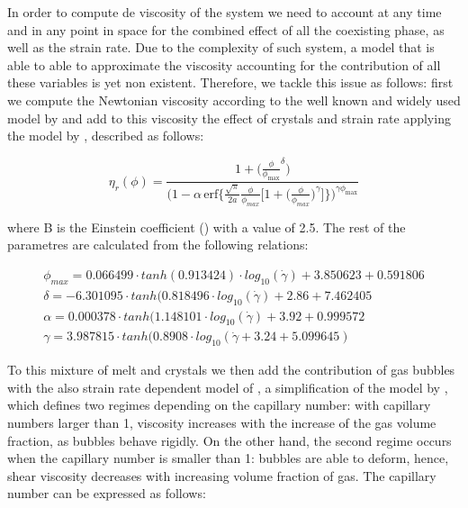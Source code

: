 In order to compute de viscosity of the system we need to account at any time and in any point in space for the combined effect of all the coexisting phase, as well as the strain rate. Due to the complexity of such system, a model that is able to able to approximate the viscosity accounting for the contribution of all these variables is yet non existent. Therefore, we tackle this issue as follows: first we compute the Newtonian viscosity according to the well known and widely used model by \cite{giordano200} and add to this viscosity the effect of crystals and strain rate applying the model by \cite{caricchi2007}, described as follows:

\begin{equation}
\eta_r(\phi) = \frac{1 + \big(\frac{\phi}{\phi_{\text{max}}}^{\delta}\big)}
{\bigg(1 - \alpha \, \text{erf} \bigg\{ \frac{\sqrt{\pi}}{2a} \frac{\phi}{\phi_{max}}
\bigg[ 1 + \bigg(\frac{\phi}{\phi_{max}}\bigg)^\gamma \bigg] \bigg\}\bigg)^{\gamma \phi_{\text{max}}}}
\end{equation}

where B is the Einstein coefficient (\cite{einstein1905}) with a value of 2.5. The rest of the parametres are calculated from the following relations:

\begin{equation}
    \begin{aligned}
        \phi_{max} = 0.066499·tanh(0.913424)·log_{10}(\dot{\gamma}) + 3.850623 + 0.591806 \\
        \delta =-6.301095·tanh(0.818496·log_{10}(\dot{\gamma}) + 2.86 + 7.462405 \\
        \alpha = 0.000378·tanh(1.148101·log_{10}(\dot{\gamma}) +3.92+0.999572 \\
        \gamma = 3.987815·tanh(0.8908·log_{10}(\dot{\gamma} + 3.24 + 5.099645)        
    \end{aligned}
\end{equation}

To this mixture of melt and crystals we then add the contribution of gas bubbles with the also strain rate dependent model of \cite{llewellin2005}, a simplification of the model by \cite{pal2003}, which defines two regimes depending on the capillary number: with capillary numbers larger than 1, viscosity increases with the increase of the gas volume fraction, as bubbles behave rigidly. On the other hand, the second regime occurs when the capillary number is smaller than 1: bubbles are able to deform, hence, shear viscosity decreases with increasing volume fraction of gas. The capillary number can be expressed as follows:


